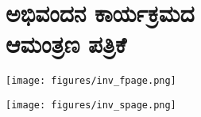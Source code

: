 \setcounter{chapter}{3}
{\fontsize{14}{16}\selectfont
\chapter[ಅಭಿವಂದನ ಕಾರ್ಯಕ್ರಮದ ಆಮಂತ್ರಣ ಪತ್ರಿಕೆ]{ಅಭಿವಂದನ ಕಾರ್ಯಕ್ರಮದ\\ ಆಮಂತ್ರಣ ಪತ್ರಿಕೆ}

\centerline{\texttt{[image: figures/inv\_fpage.png]}}
\medskip

\centerline{\texttt{[image: figures/inv\_spage.png]}}
}
